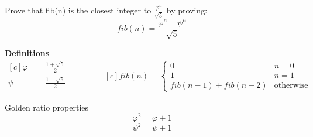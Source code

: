 \documentclass[14pt]{extarticle}
\newenvironment{problem}[2][Problem]{\begin{trivlist}
\item[\hskip \labelsep {\bfseries #1}\hskip \labelsep {\bfseries #2.}]}{\end{trivlist}}
\begin{document}
\begin{problem}{1.13}
Prove that fib(n) is the closest integer to $\frac{\varphi^n}{\sqrt{5}}$ by proving:
 $$ fib(n) = \frac{\varphi^n - \psi^n}{\sqrt{5}} $$
 \end{problem}

\textbf{Definitions}
\begin{equation*}
  \begin{aligned}[c]
    \varphi &= \frac{1 + \sqrt{5}}{2}\\
    \psi &= \frac{1 - \sqrt{5}}{2}\\
  \end{aligned}
   \qquad\qquad
 \begin{aligned}[c]
    fib(n) = \begin{cases}
               0                   & n = 0\\
               1                   & n = 1\\
               fib(n-1) + fib(n-2) & \text{otherwise}
             \end{cases}
  \end{aligned}
\end{equation*}

\vspace{5mm}
Golden ratio properties
$$\varphi^2 = \varphi + 1$$
$$\psi^2 = \psi + 1$$
\vspace{5mm}
\end{document}
